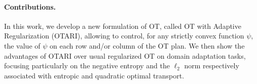 \paragraph{Contributions.} In this work, we develop a new formulation of OT, called OT with Adaptive Regularization (OTARI), allowing to control, for any strictly convex function $\psi$, the value of $\psi$ on each row and/or column of the OT plan. 
We then show the advantages of OTARI over usual regularized OT on domain adaptation tasks, focusing particularly on the negative entropy and the $\ell_2$ norm respectively associated with entropic \citep{cuturi2013sinkhorn} and quadratic \citep{blondel2018smooth} optimal transport.